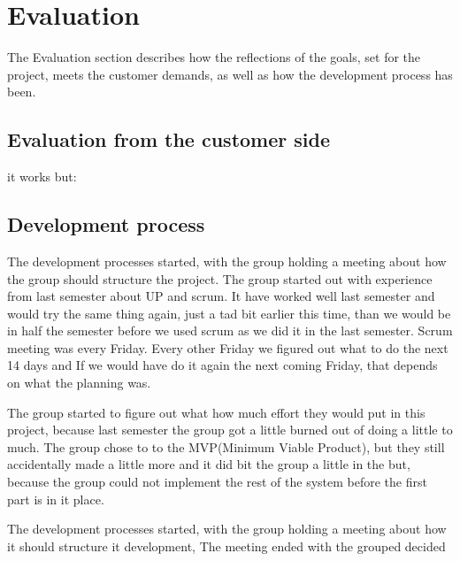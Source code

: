 \section{Evaluation}
The Evaluation section describes how the reflections of the goals,
set for the project, meets the customer demands, 
as well as how the development process has been.

\subsection{Evaluation from the customer side}

it works but:


\subsection{Development process}
The development processes started, with the group holding a meeting about
how the group should structure the project.
The group started out with experience from last semester about UP and scrum.
It have worked well last semester and would try the same thing again, just a tad
bit earlier this time, than we would be in half the semester before we used scrum
as we did it in the last semester.
Scrum meeting was every Friday. Every other Friday we figured out what to do the next 
14 days and If we would have do it again the next coming Friday, that depends on
what the planning was.

The group started to figure out what how much effort they would put in this project,
because last semester the group got a little burned out of doing a little to much.
The group chose to to the MVP(Minimum Viable Product), but they still accidentally
made a little more and it did bit the group a little in the but, because the group 
could not implement the rest of the system before the first part is in it place.



The development processes started, with the group holding a meeting about
how it should structure it development, The meeting ended with the grouped decided





